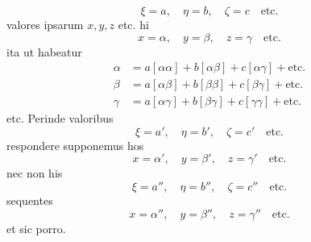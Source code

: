 \[
\xi=a,\quad\eta=b,\quad\zeta=c\quad\text{etc.}
\]
valores ipsarum \(x,y,z\) etc. hi
\[
x=\alpha,\quad y=\beta,\quad z=\gamma\quad\text{etc.}
\]
ita ut habeatur
\[
\begin{aligned}
\alpha&=a[\alpha\alpha]+b[\alpha\beta]+c[\alpha\gamma]+\text{etc.}\\
\beta&=a[\alpha\beta]+b[\beta\beta]+c[\beta\gamma]+\text{etc.}\\
\gamma&=a[\alpha\gamma]+b[\beta\gamma]+c[\gamma\gamma]+\text{etc.}
\end{aligned}
\]
etc. Perinde valoribus
\[
\xi=a',\quad\eta=b',\quad\zeta=c'\quad\text{etc.}
\]
respondere supponemus hos
\[
x=\alpha',\quad y=\beta',\quad z=\gamma'\quad\text{etc.}
\]
nec non his
\[
\xi=a'',\quad\eta=b'',\quad\zeta=c''\quad\text{etc.}
\]
sequentes
\[
x=\alpha'',\quad y=\beta'',\quad z=\gamma''\quad\text{etc.}
\]
et sic porro.

